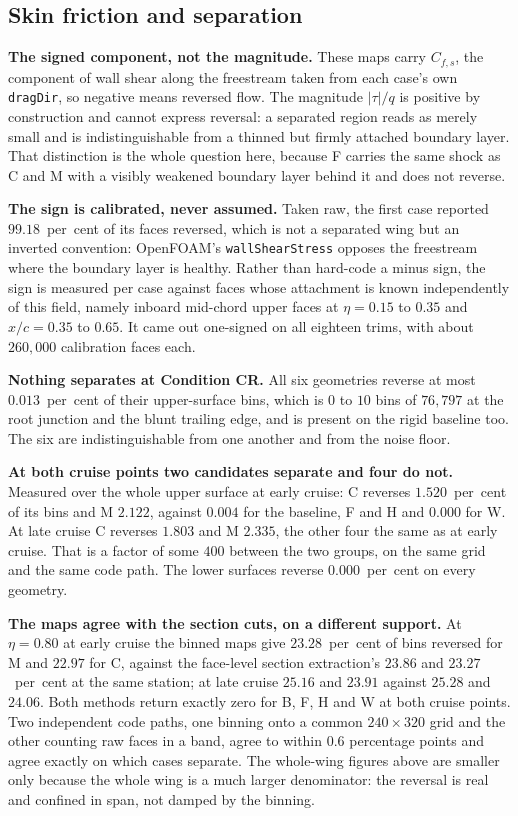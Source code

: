 \subsection{Skin friction and separation}
\label{sec:deltamaps:cfs}

\textbf{The signed component, not the magnitude.} These maps carry $C_{f,s}$, the component of
wall shear along the freestream taken from each case's own \texttt{dragDir}, so negative means
reversed flow. The magnitude $|\tau|/q$ is positive by construction and cannot express
reversal: a separated region reads as merely small and is indistinguishable from a thinned but
firmly attached boundary layer. That distinction is the whole question here, because F carries
the same shock as C and M with a visibly weakened boundary layer behind it and does not reverse.

\textbf{The sign is calibrated, never assumed.} Taken raw, the first case reported
$99.18$~per~cent of its faces reversed, which is not a separated wing but an inverted
convention: OpenFOAM's \texttt{wallShearStress} opposes the freestream where the boundary layer
is healthy. Rather than hard-code a minus sign, the sign is measured per case against faces
whose attachment is known independently of this field, namely inboard mid-chord upper faces at
$\eta = 0.15$ to $0.35$ and $x/c = 0.35$ to $0.65$. It came out one-signed on all eighteen trims,
with about $260{,}000$ calibration faces each.

\textbf{Nothing separates at Condition CR.} All six geometries reverse at most $0.013$~per~cent
of their upper-surface bins, which is $0$ to $10$ bins of $76{,}797$ at the root junction and the
blunt trailing edge, and is present on the rigid baseline too. The six are indistinguishable from
one another and from the noise floor.

\textbf{At both cruise points two candidates separate and four do not.} Measured over the whole
upper surface at early cruise: C reverses $1.520$~per~cent of its bins and M $2.122$, against
$0.004$ for the baseline, F and H and $0.000$ for W. At late cruise C reverses $1.803$ and M
$2.335$, the other four the same as at early cruise. That is a factor of some $400$ between the
two groups, on the same grid and the same code path. The lower surfaces reverse
$0.000$~per~cent on every geometry.

\textbf{The maps agree with the section cuts, on a different support.} At $\eta = 0.80$ at early
cruise the binned maps give $23.28$~per~cent of bins reversed for M and $22.97$ for C, against
the face-level section extraction's $23.86$ and $23.27$~per~cent at the same station; at late
cruise $25.16$ and $23.91$ against $25.28$ and $24.06$. Both methods return exactly zero for B,
F, H and W at both cruise points. Two independent code paths, one binning onto a common
$240 \times 320$ grid and the other counting raw faces in a band, agree to within $0.6$
percentage points and agree exactly on which cases separate. The whole-wing figures above
are smaller only because the whole wing is a much larger denominator: the reversal is real and
confined in span, not damped by the binning.

